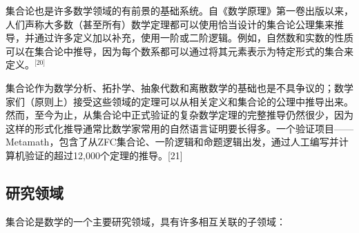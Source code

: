 集合论也是许多数学领域的有前景的基础系统。自《数学原理》第一卷出版以来，人们声称大多数（甚至所有）数学定理都可以使用恰当设计的集合论公理集来推导，并通过许多定义加以补充，使用一阶或二阶逻辑。例如，自然数和实数的性质可以在集合论中推导，因为每个数系都可以通过将其元素表示为特定形式的集合来定义。\(^\text{[20]}\)

集合论作为数学分析、拓扑学、抽象代数和离散数学的基础也是不具争议的；数学家们（原则上）接受这些领域的定理可以从相关定义和集合论的公理中推导出来。然而，至今为止，从集合论中正式验证的复杂数学定理的完整推导仍然很少，因为这样的形式化推导通常比数学家常用的自然语言证明要长得多。一个验证项目——Metamath，包含了从ZFC集合论、一阶逻辑和命题逻辑出发，通过人工编写并计算机验证的超过12,000个定理的推导。[21]
\subsection{研究领域}  
集合论是数学的一个主要研究领域，具有许多相互关联的子领域：